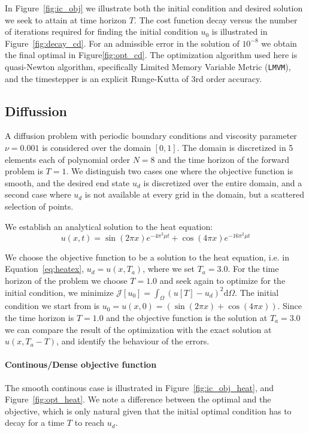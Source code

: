 \documentclass[10pt]{article}
\renewcommand{\d}{\mathrm{d}}
\begin{document}
{In Figure~\ref{fig:ic_obj} we illustrate both the initial condition and desired solution we seek to attain at time horizon $T$. The cost function decay versus the number of iterations required for finding the initial condition $u_0$ is illustrated in Figure~\ref{fig:decay_cd}. For an admissible error in the solution of $10^{-8}$ we obtain the final optimal in Figure\ref{fig:opt_cd}. The optimization algorithm used here is quasi-Newton algorithm, specifically Limited Memory Variable Metric (\texttt{LMVM}), and the timestepper is an explicit Runge-Kutta of 3rd order accuracy.


\subsection{Diffussion}

A diffusion problem with periodic boundary conditions and viscosity parameter $\nu=0.001$ is considered over the domain $[0,1]$. The domain is discretized in 5 elements each of polynomial order $N=8$ and the time horizon of the forward problem is $T=1$. We distinguish two cases one where the objective function is smooth, and the desired end state $u_d$ is discretized over the entire domain, and a second case where $u_d$ is not available at every grid in the domain, but a scattered selection of points.

We establish an analytical solution to the heat equation: 
\begin{equation}
u(x,t)=\sin(2\pi x)e^{-4\pi^2\mu t}+\cos(4\pi x)e^{-16\pi^2\mu t}
\label{eq:heatex}
\end{equation}

We choose the objective function to be a solution to the heat equation, i.e. in Equation~\ref{eq:heatex}, $u_d=u(x,T_a)$, where we set $T_a=3.0$. For the time horizon of the problem we choose $T=1.0$ and seek again to optimize for the initial condition, we minimize $\mathcal J[u_0]=\int_{\Omega} (u[T]-u_d)^2 \d \Omega$. The initial condition we start from is $u_0=u(x,0)=(\sin(2\pi x)+\cos(4\pi x))$. Since the time horizon is $T=1.0$ and the objective function is the solution at $T_a=3.0$ we can compare the result of the optimization with the exact solution at $u(x,T_a-T)$, and identify the behaviour of the errors.

\paragraph{Continous/Dense objective function} 
The smooth continous case is illustrated in Figure~\ref{fig:ic_obj_heat}, and Figure~\ref{fig:opt_heat}. We note a difference between the optimal and the objective, which is only natural given that the initial optimal condition has to decay for a time $T$ to reach $u_d$.

}
\end{document}
